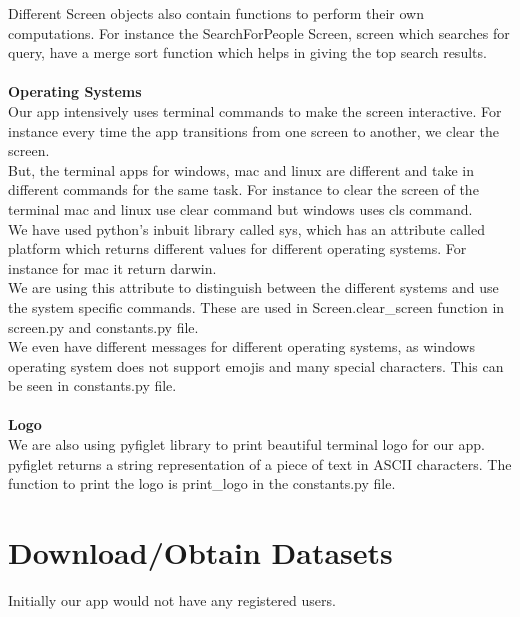 \documentclass[11pt]{report}
\begin{document}
Different Screen objects also contain functions to perform their own computations. For instance the SearchForPeople Screen, screen which searches for query, have a merge sort function which helps in giving the top search results. \\\\

{\bf Operating Systems}~\\

Our app intensively uses terminal commands to make the screen interactive. For instance every time the app transitions from one screen to another, we clear the screen. \\

But, the terminal apps for windows, mac and linux are different and take in different commands for the same task. For instance to clear the screen of the terminal mac and linux use clear command but windows uses cls command. \\

We have used python's inbuit library called sys, which has an attribute called platform which returns different values for different operating systems. For instance for mac it return darwin. \\

We are using this attribute to distinguish between the different systems and use the system specific commands. These are used in Screen.clear\_screen function in screen.py and constants.py file. \\

We even have different messages for different operating systems, as windows operating system does not support emojis and many special characters. This can be seen in constants.py file.\\\\

{\bf Logo }\\

We are also using pyfiglet library to print beautiful terminal logo for our app. pyfiglet returns a string representation of a piece of text in ASCII characters. The function to print the logo is print\_logo in the constants.py file.

\newpage 

\chapter{Download/Obtain Datasets} 


Initially  our  app  would  not  have  any  registered users. \\
\end{document}
